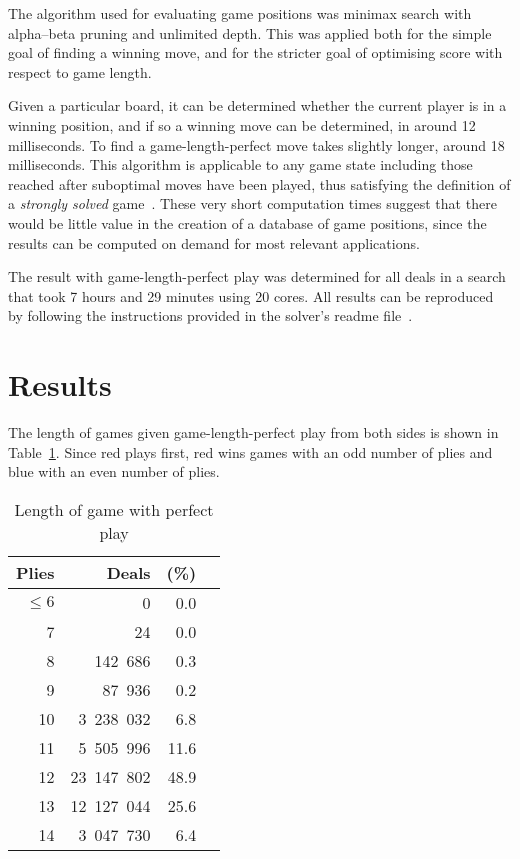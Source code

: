 \documentclass[a4paper, twocolumn]{article}
\begin{document}
The algorithm used for evaluating game positions was minimax search with
alpha--beta pruning and unlimited depth. This was applied both for the simple
goal of finding a winning move, and for the stricter goal of optimising score
with respect to game length.

Given a particular board, it can be determined whether the current player is in
a winning position, and if so a winning move can be determined, in around 12
milliseconds. To find a game-length-perfect move takes slightly longer, around
18 milliseconds. This algorithm is applicable to any game state including those
reached after suboptimal moves have been played, thus satisfying the definition
of a \textit{strongly solved} game~\cite{games-solved}. These very short
computation times suggest that there would be little value in the creation of a
database of game positions, since the results can be computed on demand for most
relevant applications.

The result with game-length-perfect play was determined for all deals in a
search that took 7 hours and 29 minutes using 20 cores. All results can be
reproduced by following the instructions provided in the solver's readme
file~\cite{github}.


\section{Results}

The length of games given game-length-perfect play from both sides is shown in
Table~\ref{tab:game-length}. Since red plays first, red wins games with an odd
number of plies and blue with an even number of plies.

\begin{table}[ht]
  \centering
  \begin{tabular}{r r r c}
    \toprule
    \textbf{Plies} & \textbf{Deals} & \textbf{(\%)} \\
    \midrule
    $\leq 6$ & 0 & 0.0 \\
    7 & 24 & 0.0 \\
    8 & 142~686 & 0.3 \\
    9 & 87~936 & 0.2 \\
    10 & 3~238~032 & 6.8 \\
    11 & 5~505~996 & 11.6 \\
    12 & 23~147~802 & 48.9 \\
    13 & 12~127~044 & 25.6 \\
    14 & 3~047~730 & 6.4 \\
    \bottomrule
  \end{tabular}
  \caption{Length of game with perfect play}
  \label{tab:game-length}
\end{table}
\end{document}
